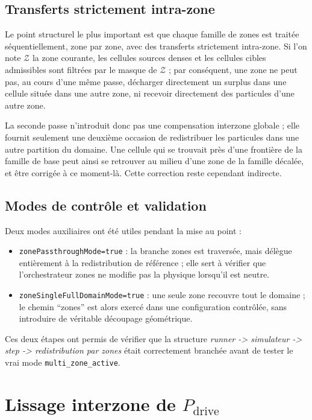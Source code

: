 \documentclass[11pt,a4paper]{article}
\begin{document}
\subsection{Transferts strictement intra-zone}

Le point structurel le plus important est que chaque famille de zones est traitée séquentiellement, zone par zone, avec des transferts strictement intra-zone. Si l'on note $\mathcal Z$ la zone courante, les cellules sources denses et les cellules cibles admissibles sont filtrées par le masque de $\mathcal Z$ ; par conséquent, une zone ne peut pas, au cours d'une même passe, décharger directement un surplus dans une cellule située dans une autre zone, ni recevoir directement des particules d'une autre zone.

La seconde passe n'introduit donc pas une compensation interzone globale ; elle fournit seulement une deuxième occasion de redistribuer les particules dans une autre partition du domaine. Une cellule qui se trouvait près d'une frontière de la famille de base peut ainsi se retrouver au milieu d'une zone de la famille décalée, et être corrigée à ce moment-là. Cette correction reste cependant indirecte.

\subsection{Modes de contrôle et validation}

Deux modes auxiliaires ont été utiles pendant la mise au point :
\begin{itemize}
  \item \verb|zonePassthroughMode=true| : la branche zones est traversée, mais délègue entièrement à la redistribution de référence ; elle sert à vérifier que l'orchestrateur zones ne modifie pas la physique lorsqu'il est neutre.
  \item \verb|zoneSingleFullDomainMode=true| : une seule zone recouvre tout le domaine ; le chemin ``zones'' est alors exercé dans une configuration contrôlée, sans introduire de véritable découpage géométrique.
\end{itemize}
Ces deux étapes ont permis de vérifier que la structure \emph{runner -> simulateur -> step -> redistribution par zones} était correctement branchée avant de tester le vrai mode \verb|multi_zone_active|.

\section{Lissage interzone de $P_{\mathrm{drive}}$}
\end{document}
